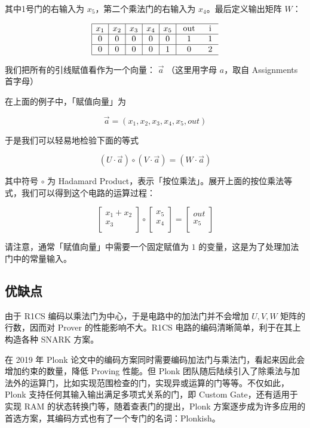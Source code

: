 其中1号门的右输入为 \(x_5\)，第二个乘法门的右输入为
\(x_4\)。最后定义输出矩阵 \(W\)：

$$
\begin{array}{|c|c|c|c|c|cc}
\hline x_1 & x_2 & x_3 & x_4 & x_5 & \text { out } & \text { i } \\
\hline 0 & 0 & 0 & 0 & 0 & 1 & 1 \\
\hline 0 & 0 & 0 & 0 & 1 & 0 & 2 \\
\hline
\end{array}
$$

我们把所有的引线赋值看作为一个向量： \(\vec{a}\) （这里用字母
\(a\)，取自 Assignments 首字母）

在上面的例子中，「赋值向量」为

\[
\vec{a} = (x_1, x_2, x_3,x_4,x_5,out)
\]

于是我们可以轻易地检验下面的等式

\[
(U \cdot \vec{a}) \circ (V \cdot \vec{a}) = (W \cdot\vec{a})
\]

其中符号 \(\circ\) 为 Hadamard
Product，表示「按位乘法」。展开上面的按位乘法等式，我们可以得到这个电路的运算过程：

\[
\left[
\begin{array}{c}
x_1 + x_2 \\
x_3 \\
\end{array}
\right]
\circ
\left[
\begin{array}{c}
x_5 \\
x_4 \\
\end{array}
\right]=
\left[
\begin{array}{c}
out \\
x_5 \\
\end{array}
\right]
\]

请注意，通常「赋值向量」中需要一个固定赋值为 \(1\)
的变量，这是为了处理加法门中的常量输入。

\hypertarget{ux4f18ux7f3aux70b9}{%
\subsection{优缺点}\label{ux4f18ux7f3aux70b9}}

由于 R1CS 编码以乘法门为中心，于是电路中的加法门并不会增加 \(U, V, W\)
矩阵的行数，因而对 Prover 的性能影响不大。R1CS
电路的编码清晰简单，利于在其上构造各种 SNARK 方案。

在 2019 年 Plonk
论文中的编码方案同时需要编码加法门与乘法门，看起来因此会增加约束的数量，降低
Proving 性能。但 Plonk
团队随后陆续引入了除乘法与加法外的运算门，比如实现范围检查的门，实现异或运算的门等等。不仅如此，Plonk
支持任何其输入输出满足多项式关系的门，即 Custom Gate，还有适用于实现 RAM
的状态转换门等，随着查表门的提出，Plonk
方案逐步成为许多应用的首选方案，其编码方式也有了一个专门的名词：Plonkish。

